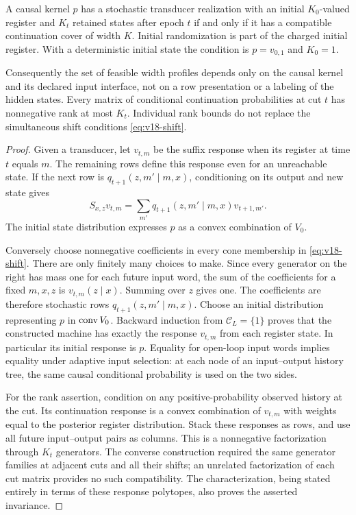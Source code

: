 \begin{theorem}
\label{thm:v18-continuation}
A causal kernel $p$ has a stochastic transducer realization with an initial
$K_0$-valued register and $K_t$ retained states after epoch $t$ if and only
if it has a compatible continuation cover of width $K$. Initial
randomization is part of the charged initial register. With a deterministic
initial state the condition is $p=v_{0,1}$ and $K_0=1$.

Consequently the set of feasible width profiles depends only on the causal
kernel and its declared input interface, not on a row presentation or a
labeling of the hidden states. Every matrix of conditional continuation
probabilities at cut $t$ has nonnegative rank at most $K_t$. Individual
rank bounds do not replace the simultaneous shift conditions
\eqref{eq:v18-shift}.
\end{theorem}
\begin{proof}
Given a transducer, let $v_{t,m}$ be the suffix response when its register
at time $t$ equals $m$. The remaining rows define this response even for
an unreachable state. If the next row is
$q_{t+1}(z,m'\mid m,x)$, conditioning on its output and new state gives
\[
 S_{x,z}v_{t,m}=\sum_{m'}q_{t+1}(z,m'\mid m,x)v_{t+1,m'}.
\]
The initial state distribution expresses $p$ as a convex combination of
$V_0$.

Conversely choose nonnegative coefficients in every cone membership in
\eqref{eq:v18-shift}. There are only finitely many choices to make. Since
every generator on the right has mass one for each future input word,
the sum of the coefficients for a fixed $m,x,z$ is $v_{t,m}(z\mid x)$.
Summing over $z$ gives one. The coefficients are therefore stochastic
rows $q_{t+1}(z,m'\mid m,x)$. Choose an initial distribution representing
$p$ in $\operatorname{conv} V_0$. Backward induction from $\mathcal C_L=\{1\}$ proves
that the constructed machine has exactly the response $v_{t,m}$ from
each register state. In particular its initial response is $p$. Equality
for open-loop input words implies equality under adaptive input selection:
at each node of an input--output history tree, the same causal conditional
probability is used on the two sides.

For the rank assertion, condition on any positive-probability observed
history at the cut. Its continuation response is a convex combination of
$v_{t,m}$ with weights equal to the posterior register distribution.
Stack these responses as rows, and use all future input--output pairs as
columns. This is a nonnegative factorization through $K_t$ generators.
The converse construction required the same generator families at adjacent
cuts and all their shifts; an unrelated factorization of each cut matrix
provides no such compatibility. The characterization, being stated entirely
in terms of these response polytopes, also proves the asserted invariance.
\end{proof}

